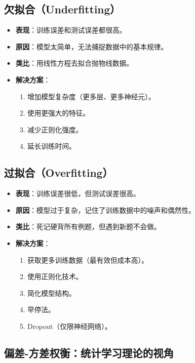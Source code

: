 \subsection{欠拟合（Underfitting）}
\begin{itemize}
    \item \textbf{表现}：训练误差和测试误差都很高。
    \item \textbf{原因}：模型太简单，无法捕捉数据中的基本规律。
    \item \textbf{类比}：用线性方程去拟合抛物线数据。
    \item \textbf{解决方案}：
    \begin{enumerate}
        \item 增加模型复杂度（更多层、更多神经元）。
        \item 使用更强大的特征。
        \item 减少正则化强度。
        \item 延长训练时间。
    \end{enumerate}
\end{itemize}

\subsection{过拟合（Overfitting）}
\begin{itemize}
    \item \textbf{表现}：训练误差很低，但测试误差很高。
    \item \textbf{原因}：模型过于复杂，记住了训练数据中的噪声和偶然性。
    \item \textbf{类比}：死记硬背所有例题，但遇到新题不会做。
    \item \textbf{解决方案}：
    \begin{enumerate}
        \item 获取更多训练数据（最有效但成本高）。
        \item 使用正则化技术。
        \item 简化模型结构。
        \item 早停法。
        \item Dropout（仅限神经网络）。
    \end{enumerate}
\end{itemize}

\subsection{偏差-方差权衡：统计学习理论的视角}

